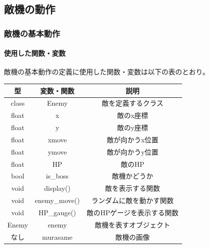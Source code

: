 \documentclass[a4paper,titlepage,11pt]{ltjsarticle}
\begin{document}
\subsection{敵機の動作}
\label{Enemy}
\subsubsection{敵機の基本動作}
\paragraph{使用した関数・変数}
敵機の基本動作の定義に使用した関数・変数は以下の表のとおり。
\begin{table}[H]
	\begin{center}
		\begin{tabular}{|c|c|c|}
			\hline
			型 & 変数・関数 & 説明\\  \hline \hline
			class & Enemy & 敵を定義するクラス \\ \hline
			float & x & 敵のx座標 \\ \hline 
			float & y & 敵のy座標 \\ \hline 
			float & xmove & 敵が向かうx位置 \\ \hline 
			float & ymove & 敵が向かうy位置 \\ \hline 
			float & HP & 敵のHP \\ \hline 
			bool & is\_boss & 敵機かどうか \\ \hline
			void & display() & 敵を表示する関数 \\ \hline 
			void & enemy\_move() & ランダムに敵を動かす関数 \\ \hline
			void & HP\_gauge() & 敵のHPゲージを表示する関数 \\ \hline 
			Enemy & enemy & 敵機を表すオブジェクト \\ \hline
			なし & murasame & 敵機の画像 \\ \hline
		\end{tabular}
	\end{center}
\end{table}
\end{document}
